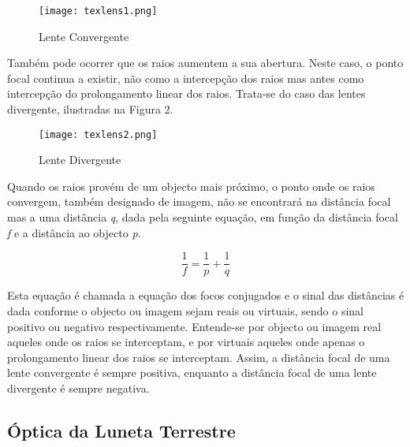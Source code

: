 \documentclass[a4paper,12pt]{article}
\begin{document}
\begin{figure}[h]
\caption{Lente Convergente}
\begin{center}
\texttt{[image: texlens1.png]}
\end{center}
\end{figure}

\par
Também pode ocorrer que os raios aumentem a sua abertura. Neste caso, o ponto focal continua a existir, não como a intercepção dos raios mas antes como intercepção do prolongamento linear dos raios. Trata-se do caso das lentes divergente, ilustradas na Figura 2.


\begin{figure}[h]
\caption{Lente Divergente}
\begin{center}
\texttt{[image: texlens2.png]}
\end{center}
\end{figure}

\par 
Quando os raios provém de um objecto mais próximo, o ponto onde os raios convergem, também designado de imagem, não se encontrará na distância focal mas a uma distância {\it q}, dada pela seguinte equação, em função da distância focal {\it f} e a distância ao objecto {\it p}.

\begin{equation}
\frac{1}{f}=\frac{1}{p}+\frac{1}{q}
\end{equation}

\par
Esta equação é chamada a equação dos focos conjugados e o sinal das distâncias é dada conforme o objecto ou imagem sejam reais ou virtuais, sendo o sinal positivo ou negativo respectivamente. Entende-se por objecto ou imagem real aqueles onde os raios se interceptam, e por virtuais aqueles onde apenas o prolongamento linear dos raios se interceptam. Assim, a distância focal de uma lente convergente é sempre positiva, enquanto a distância focal de uma lente divergente é sempre negativa.

\subsection{Óptica da Luneta Terrestre}
\end{document}
